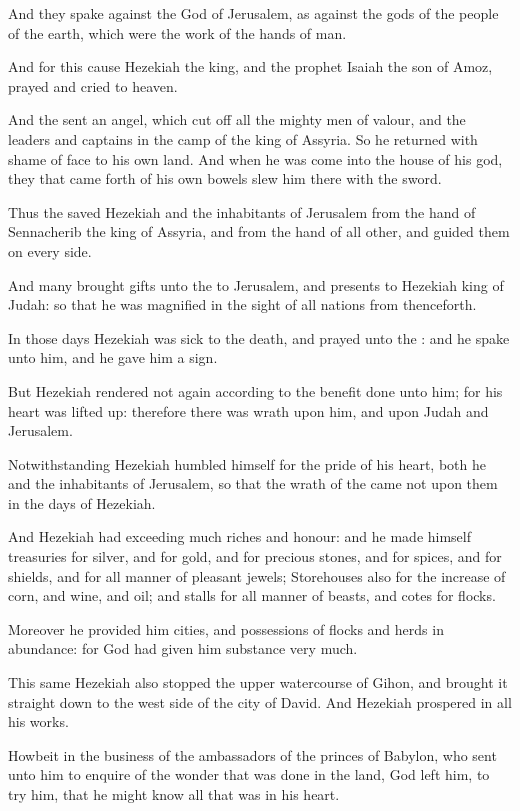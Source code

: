 \verse And they spake against the God of Jerusalem, as against the gods of the people of the earth, which were the work of the hands of man.

\verse And for this cause Hezekiah the king, and the prophet Isaiah the son of Amoz, prayed and cried to heaven.

\verse And the \LORD sent an angel, which cut off all the mighty men of valour, and the leaders and captains in the camp of the king of Assyria. So he returned with shame of face to his own land. And when he was come into the house of his god, they that came forth of his own bowels slew him there with the sword.

\verse Thus the \LORD saved Hezekiah and the inhabitants of Jerusalem from the hand of Sennacherib the king of Assyria, and from the hand of all other, and guided them on every side.

\verse And many brought gifts unto the \LORD to Jerusalem, and presents to Hezekiah king of Judah: so that he was magnified in the sight of all nations from thenceforth.

\verse In those days Hezekiah was sick to the death, and prayed unto the \LORD: and he spake unto him, and he gave him a sign.

\verse But Hezekiah rendered not again according to the benefit done unto him; for his heart was lifted up: therefore there was wrath upon him, and upon Judah and Jerusalem.

\verse Notwithstanding Hezekiah humbled himself for the pride of his heart, both he and the inhabitants of Jerusalem, so that the wrath of the \LORD came not upon them in the days of Hezekiah.

\verse And Hezekiah had exceeding much riches and honour: and he made himself treasuries for silver, and for gold, and for precious stones, and for spices, and for shields, and for all manner of pleasant jewels; \verse Storehouses also for the increase of corn, and wine, and oil; and stalls for all manner of beasts, and cotes for flocks.

\verse Moreover he provided him cities, and possessions of flocks and herds in abundance: for God had given him substance very much.

\verse This same Hezekiah also stopped the upper watercourse of Gihon, and brought it straight down to the west side of the city of David.  And Hezekiah prospered in all his works.

\verse Howbeit in the business of the ambassadors of the princes of Babylon, who sent unto him to enquire of the wonder that was done in the land, God left him, to try him, that he might know all that was in his heart.

